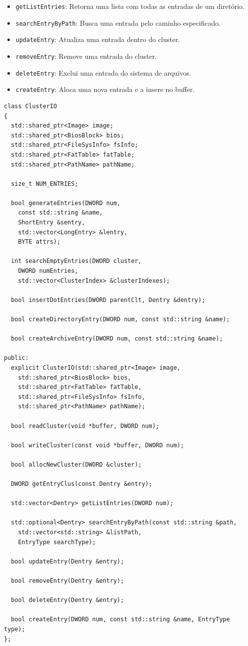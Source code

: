 \documentclass[
    12pt,				%
    oneside,   	        %
    a4paper,			%
    english,			%
    french,				%
    spanish,			%
    brazil,				%
    ]{pacotes/abntex2}
\begin{document}
\begin{itemize}
\begin{itemize}
            \item \texttt{getListEntries}: Retorna uma lista com todas as entradas de um diretório.
            \item \texttt{searchEntryByPath}: Busca uma entrada pelo caminho especificado.
            \item \texttt{updateEntry}: Atualiza uma entrada dentro do cluster.
            \item \texttt{removeEntry}: Remove uma entrada do cluster.
            \item \texttt{deleteEntry}: Exclui uma entrada do sistema de arquivos.
            \item \texttt{createEntry}: Aloca uma nova entrada e a insere no buffer.
        \end{itemize}
\end{itemize}


\begin{lstlisting}[caption={Classe de abstração dos clusters do sistema}, label={lst:cluster_io}]
class ClusterIO
{
  std::shared_ptr<Image> image;
  std::shared_ptr<BiosBlock> bios;
  std::shared_ptr<FileSysInfo> fsInfo;
  std::shared_ptr<FatTable> fatTable;
  std::shared_ptr<PathName> pathName;
  
  size_t NUM_ENTRIES;

  bool generateEntries(DWORD num,
    const std::string &name,
    ShortEntry &sentry,
    std::vector<LongEntry> &lentry,
    BYTE attrs);

  int searchEmptyEntries(DWORD cluster,
    DWORD numEntries,
    std::vector<ClusterIndex> &clusterIndexes);

  bool insertDotEntries(DWORD parentClt, Dentry &dentry);

  bool createDirectoryEntry(DWORD num, const std::string &name);

  bool createArchiveEntry(DWORD num, const std::string &name);

public:
  explicit ClusterIO(std::shared_ptr<Image> image,
    std::shared_ptr<BiosBlock> bios,
    std::shared_ptr<FatTable> fatTable,
    std::shared_ptr<FileSysInfo> fsInfo,
    std::shared_ptr<PathName> pathName);
    
  bool readCluster(void *buffer, DWORD num);

  bool writeCluster(const void *buffer, DWORD num);

  bool allocNewCluster(DWORD &cluster);

  DWORD getEntryClus(const Dentry &entry);

  std::vector<Dentry> getListEntries(DWORD num);

  std::optional<Dentry> searchEntryByPath(const std::string &path,
    std::vector<std::string> &listPath,
    EntryType searchType);

  bool updateEntry(Dentry &entry);

  bool removeEntry(Dentry &entry);

  bool deleteEntry(Dentry &entry);

  bool createEntry(DWORD num, const std::string &name, EntryType type);
};
\end{lstlisting}
\end{document}
